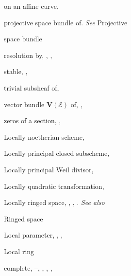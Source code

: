 {{\noindent\hspace*{7.5bp}on an affine curve, \par
\noindent\hspace*{7.5bp}projective space bundle of. \emph{See} Projective\par
\noindent\hspace*{15.0bp}space bundle\par
\noindent\hspace*{7.5bp}resolution by, , , \par
\noindent\hspace*{7.5bp}stable, , \par
\noindent\hspace*{7.5bp}trivial subsheaf of, \par
\noindent\hspace*{7.5bp}vector bundle $\mathbf V(\mathcal E)$ of, , \par
\noindent\hspace*{7.5bp}zeros of a section, , \par
\noindent\hspace*{0.0bp}Locally noetherian scheme, \par
\noindent\hspace*{0.0bp}Locally principal closed subscheme, \par
\noindent\hspace*{0.0bp}Locally principal Weil divisor, \par
\noindent\hspace*{0.0bp}Locally quadratic transformation, \par
\noindent\hspace*{0.0bp}Locally ringed space, , , . \emph{See also}\par
\noindent\hspace*{15.0bp}Ringed space\par
\noindent\hspace*{0.0bp}Local parameter, , , \par
\noindent\hspace*{0.0bp}Local ring\par
\noindent\hspace*{7.5bp}complete, --, , , , \par
}}
